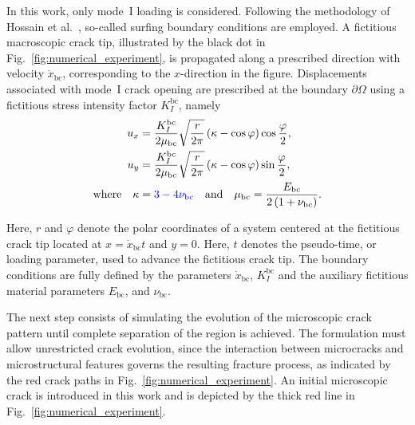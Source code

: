 \documentclass[pdflatex,sn-mathphys-num]{sn-jnl}%
\newcommand{\changed}[1]{\begingroup\color{blue}#1\endgroup}
\theoremstyle{thmstyleone}%
\theoremstyle{thmstyletwo}%
\theoremstyle{thmstylethree}%
\begin{document}
In this work, only mode~I loading is considered.
Following the methodology of Hossain et al.~\cite{hossain_effective_2014}, so-called surfing boundary conditions are employed.
A fictitious macroscopic crack tip, illustrated by the black dot in Fig.~\ref{fig:numerical_experiment}, is propagated along a prescribed direction with velocity $\dot{x}_{\text{bc}}$, 
corresponding to the $x$-direction in the figure.
Displacements associated with mode~I crack opening are prescribed at the boundary $\partial\Omega$ using a fictitious 
stress intensity factor $K_I^{\text{bc}}$, namely
\begin{align}
    \begin{split}
        u_x &= \dfrac{K_I^{\text{bc}}}{2\mu_{\text{bc}}}  \sqrt{\dfrac{r}{2\pi}}\left(\kappa - \cos{\varphi}\right)\cos{\dfrac{\varphi}{2}},\\
        u_y &= \dfrac{K_I^{\text{bc}}}{2\mu_{\text{bc}}}  \sqrt{\dfrac{r}{2\pi}}\left(\kappa - \cos{\varphi}\right)\sin{\dfrac{\varphi}{2}},\\
        \text{where} \quad \kappa &= \changed{3 - 4\nu_{\text{bc}}} \quad \text{and} \quad \mu_{\text{bc}} = \dfrac{E_{\text{bc}}}{2\left(1 + \nu_{\text{bc}}\right)}.
        \label{eq:surfing-bcs}
    \end{split}
\end{align}

Here, $r$ and $\varphi$ denote the polar coordinates of a system centered at the fictitious 
crack tip located at $x = \dot{x}_{\text{bc}} t$ and $y = 0$.
Here, $t$ denotes the pseudo-time, or loading parameter, used to advance the fictitious crack tip.
The boundary conditions are fully defined by the 
parameters $\dot{x}_{\text{bc}}$, $K_I^{\text{bc}}$ and the auxiliary fictitious material parameters  
$E_{\text{bc}}$, and $\nu_{\text{bc}}$.

The next step consists of simulating the evolution of the microscopic crack pattern until complete separation of the  region is achieved.
The formulation must allow unrestricted crack evolution, since the interaction between microcracks and microstructural features governs the resulting fracture process, as indicated by the red crack paths in Fig.~\ref{fig:numerical_experiment}.
An initial microscopic crack is introduced in this work and is depicted by the thick red line in Fig.~\ref{fig:numerical_experiment}.
\end{document}
